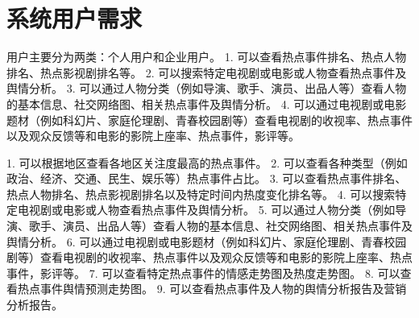 \section{系统用户需求}
用户主要分为两类：个人用户和企业用户。
1.	可以查看热点事件排名、热点人物排名、热点影视剧排名等。
2.	可以搜索特定电视剧或电影或人物查看热点事件及舆情分析。
3.	可以通过人物分类（例如导演、歌手、演员、出品人等）查看人物的基本信息、社交网络图、相关热点事件及舆情分析。
4.	可以通过电视剧或电影题材（例如科幻片、家庭伦理剧、青春校园剧等）查看电视剧的收视率、热点事件以及观众反馈等和电影的影院上座率、热点事件，影评等。

1.	可以根据地区查看各地区关注度最高的热点事件。
2.	可以查看各种类型（例如政治、经济、交通、民生、娱乐等）热点事件占比。
3.	可以查看热点事件排名、热点人物排名、热点影视剧排名以及特定时间内热度变化排名等。
4.	可以搜索特定电视剧或电影或人物查看热点事件及舆情分析。
5.	可以通过人物分类（例如导演、歌手、演员、出品人等）查看人物的基本信息、社交网络图、相关热点事件及舆情分析。
6.	可以通过电视剧或电影题材（例如科幻片、家庭伦理剧、青春校园剧等）查看电视剧的收视率、热点事件以及观众反馈等和电影的影院上座率、热点事件，影评等。
7.	可以查看特定热点事件的情感走势图及热度走势图。
8.	可以查看热点事件舆情预测走势图。
9.	可以查看热点事件及人物的舆情分析报告及营销分析报告。
